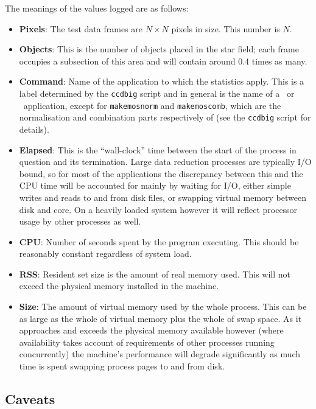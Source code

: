 The meanings of the values logged are as follows:
\begin{itemize}
%
\item {\bf Pixels}:
The test data frames are $N \times N$ pixels in size.
This number is $N$.
%
\item{\bf Objects}:
This is the number of objects placed in the star field;
each frame occupies a subsection of this area and will 
contain around 0.4 times as many.
%
\item {\bf Command}:
Name of the application to which the statistics apply.
This is a label determined by the {\tt ccdbig} script and in general
is the name of a \CCDPref\ or \KAPPAref\ application, 
except for {\tt makemosnorm} and {\tt makemoscomb},
which are the normalisation and combination parts respectively
of 
(see the {\tt ccdbig} script for details).
\item {\bf Elapsed}:
This is the ``wall-clock'' time between the start of the process
in question and its termination. 
Large data reduction processes are typically I/O bound, so
for most of the applications the discrepancy between this and the
CPU time will be accounted for mainly by waiting for I/O,
either simple writes and reads to and from disk files, 
or swapping virtual memory between disk and core.
On a heavily loaded system however it will reflect processor 
usage by other processes as well.
%
\item {\bf CPU}:
Number of seconds spent by the program executing.
This should be reasonably constant regardless of system load.
%
\item {\bf RSS}:
Resident set size is the amount of real memory used. 
This will not exceed the physical memory installed in the machine.
%
\item {\bf Size}:
The amount of virtual memory used by the whole process.
This can be as large as the whole of virtual memory plus the
whole of swap space. 
As it approaches and exceeds the physical memory available however
(where availability takes account of requirements of other 
processes running concurrently)
the machine's performance will degrade significantly as much
time is spent swapping process pages to and from disk.
\end{itemize}


\subsection{Caveats}

